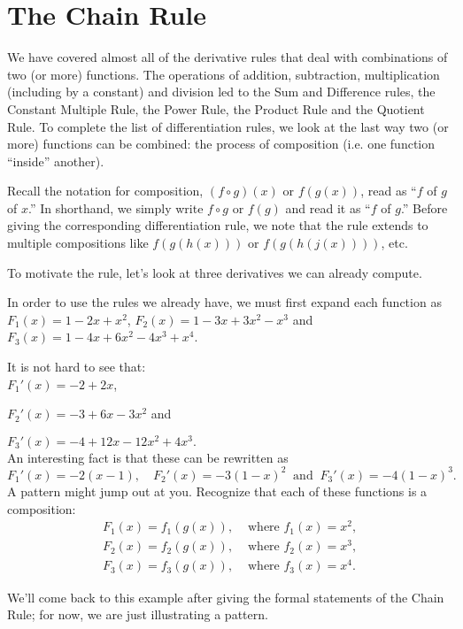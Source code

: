 
\section{The Chain Rule}\label{sec:chainrule}

We have covered almost all of the derivative rules that deal with combinations of two (or more) functions.  The operations of addition, subtraction, multiplication (including by a constant) and division led to the Sum and Difference rules, the Constant Multiple Rule, the Power Rule, the Product Rule and the Quotient Rule.  %
To complete the list of differentiation rules, we look at the last way two (or more) functions can be combined: the process of composition (i.e. one function ``inside''  another).

Recall the notation for composition, $(f \circ g)(x)$ or $f(g(x))$, read as ``$f$ of $g$ of $x$.''  In shorthand, we simply write
$f \circ g$ or $f(g)$ and read it as ``$f$ of $g$.''  Before giving the corresponding differentiation rule, we note that the rule extends to multiple compositions like $f(g(h(x)))$ or $f(g(h(j(x))))$, etc.

To motivate the rule, let's look at three derivatives we can already compute.\\


{In order to use the rules we already have, we must first expand each function as
$F_1(x) = 1 - 2x + x^2$,  $F_2(x) = 1 - 3x + 3x^2 - x^3$ and $F_3(x) = 1 - 4x + 6x^2 - 4x^3 + x^4$.
  
It is not hard to see that:\\

\noindent$F_1'(x) = -2 + 2x$,\vskip 3pt

\noindent$F_2'(x) = -3 + 6x - 3x^2$ and\vskip 3pt
  
\noindent$F_3'(x) = -4 + 12x - 12x^2 + 4x^3.$\\

An interesting fact is that these can be rewritten as
$$ 
F_1'(x) = -2(x - 1),\quad  F_2'(x) = -3(1-x)^2\ \textrm{ and } \ 
F_3'(x) = -4(1-x)^3.
$$  
A pattern might jump out at you.  Recognize that each of these functions is a composition:
\begin{eqnarray*}
F_1(x) = f_1(g(x)),& \text{ where } f_1(x) = x^2,\\
F_2(x) = f_2(g(x)),& \text{ where } f_2(x) = x^3,\\
F_3(x) = f_3(g(x)),& \text{ where } f_3(x) = x^4.
\end{eqnarray*}

We'll come back to this example after giving the formal statements of the Chain Rule; for now, we are just illustrating a pattern.}\\



